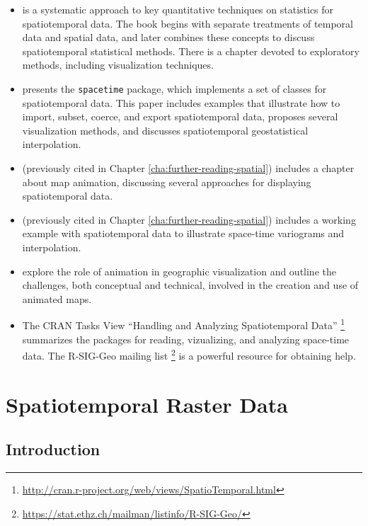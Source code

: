 \documentclass[smallroyalvopaper]{memoir}
\begin{document}
\begin{itemize}
\item \cite{Cressie.Wikle2011} is a systematic approach to key quantitative techniques on statistics for spatiotemporal data. The book begins with separate treatments of temporal data and spatial data, and later combines these concepts to discuss spatiotemporal statistical methods. There is a chapter devoted to exploratory methods, including visualization techniques.

\item \cite{Pebesma2012} presents the \texttt{spacetime} package, which implements a set of classes for spatiotemporal data. This paper includes examples that illustrate how to import, subset, coerce, and export spatiotemporal data, proposes several visualization methods, and discusses spatiotemporal geostatistical interpolation.

\item \cite{Slocum.McMaster.ea2005} (previously cited in Chapter \ref{cha:further-reading-spatial}) includes a chapter about map animation, discussing several approaches for displaying spatiotemporal data.

\item \cite{Hengl2009} (previously cited in Chapter \ref{cha:further-reading-spatial}) includes a working example with spatiotemporal data to illustrate space-time variograms and interpolation.

\item \cite{Harrower.Fabrikant2008} explore the role of animation in geographic visualization and outline the challenges, both conceptual and technical, involved in the creation and use of animated maps.

\item The CRAN Tasks View ``Handling and Analyzing Spatiotemporal Data'' \footnote{\url{http://cran.r-project.org/web/views/SpatioTemporal.html}} summarizes the packages for reading, vizualizing, and analyzing space-time data. The R-SIG-Geo mailing list \footnote{\url{https://stat.ethz.ch/mailman/listinfo/R-SIG-Geo/}} is a powerful resource for obtaining help.
\end{itemize}

\chapter{Spatiotemporal Raster Data}
\label{sec:orgheadline44}
\label{cha:rasterST}

\section{Introduction}
\label{sec-1}
\end{document}
